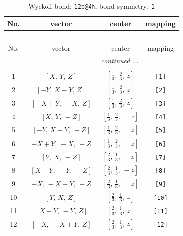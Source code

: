 \documentclass[fleqn,8pt]{jsarticle}
\begin{document}
\begin{longtable}{cccc}
\caption{Wyckoff bond: {\tt 12b@4h}, bond symmetry: {\tt 1}}
 \\
 \hline \hline
No. & vector & center & mapping \\ \hline \endfirsthead

\multicolumn{3}{l}{\tablename\ \thetable{}} \\
 \hline \hline
No. & vector & center & mapping \\ \hline \endhead

 \hline \hline
\multicolumn{3}{r}{\footnotesize\it continued ...} \\ \endfoot

 \hline \hline
\multicolumn{3}{r}{} \\ \endlastfoot

1 & $\left[ X,\, Y,\, Z \right]$ & $\left[ \frac{1}{3},\, \frac{2}{3},\, z \right]$ & {\tt [1]} \\ \hline
2 & $\left[ - Y,\, X - Y,\, Z \right]$ & $\left[ \frac{1}{3},\, \frac{2}{3},\, z \right]$ & {\tt [2]} \\ \hline
3 & $\left[ - X + Y,\, - X,\, Z \right]$ & $\left[ \frac{1}{3},\, \frac{2}{3},\, z \right]$ & {\tt [3]} \\ \hline
4 & $\left[ X,\, Y,\, - Z \right]$ & $\left[ \frac{1}{3},\, \frac{2}{3},\, - z \right]$ & {\tt [4]} \\ \hline
5 & $\left[ - Y,\, X - Y,\, - Z \right]$ & $\left[ \frac{1}{3},\, \frac{2}{3},\, - z \right]$ & {\tt [5]} \\ \hline
6 & $\left[ - X + Y,\, - X,\, - Z \right]$ & $\left[ \frac{1}{3},\, \frac{2}{3},\, - z \right]$ & {\tt [6]} \\ \hline
7 & $\left[ Y,\, X,\, - Z \right]$ & $\left[ \frac{2}{3},\, \frac{1}{3},\, - z \right]$ & {\tt [7]} \\ \hline
8 & $\left[ X - Y,\, - Y,\, - Z \right]$ & $\left[ \frac{2}{3},\, \frac{1}{3},\, - z \right]$ & {\tt [8]} \\ \hline
9 & $\left[ - X,\, - X + Y,\, - Z \right]$ & $\left[ \frac{2}{3},\, \frac{1}{3},\, - z \right]$ & {\tt [9]} \\ \hline
10 & $\left[ Y,\, X,\, Z \right]$ & $\left[ \frac{2}{3},\, \frac{1}{3},\, z \right]$ & {\tt [10]} \\ \hline
11 & $\left[ X - Y,\, - Y,\, Z \right]$ & $\left[ \frac{2}{3},\, \frac{1}{3},\, z \right]$ & {\tt [11]} \\ \hline
12 & $\left[ - X,\, - X + Y,\, Z \right]$ & $\left[ \frac{2}{3},\, \frac{1}{3},\, z \right]$ & {\tt [12]} \\
\end{longtable}
\end{document}
